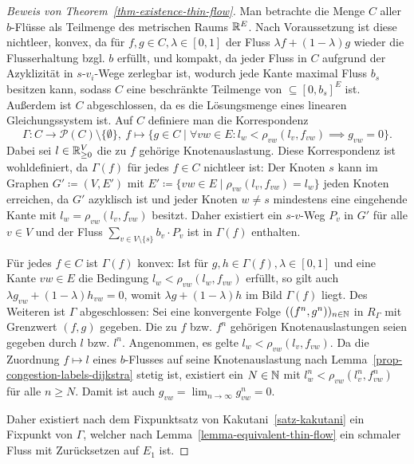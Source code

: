 \begin{proof}[Beweis von Theorem~\ref{thm-existence-thin-flow}]
	Man betrachte die Menge $C$ aller $b$-Flüsse als Teilmenge des metrischen Raums $\mathbb{R}^E$.
	Nach Voraussetzung ist diese nichtleer, konvex, da für $f, g\in C, \lambda \in [0,1]$ der Fluss $\lambda f + (1-\lambda)g$ wieder die Flusserhaltung bzgl. $b$ erfüllt, und kompakt, da jeder Fluss in $C$ aufgrund der Azyklizität in $s$-$v_i$-Wege zerlegbar ist, wodurch jede Kante maximal Fluss $b_s$ besitzen kann, sodass $C$ eine beschränkte Teilmenge von $\subseteq [0, b_s]^E$ ist.
	Außerdem ist $C$ abgeschlossen, da es die Lösungsmenge eines linearen Gleichungssystem ist.
	Auf $C$ definiere man die Korrespondenz
	\[
	\Gamma: C\to \mathcal{P}(C)\setminus\{ \emptyset \}, ~ f\mapsto \{ g\in C \mid \forall vw\in E: l_w < \rho_{vw}(l_v, f_{vw}) \implies g_{vw} = 0 \}.
	\]
	Dabei sei $l\in\mathbb{R}_{\geq 0}^V$ die zu $f$ gehörige Knotenauslastung.
	Diese Korrespondenz ist wohldefiniert, da $\Gamma(f)$ für jedes $f\in C$ nichtleer ist:
	Der Knoten $s$ kann im Graphen $G'\coloneq (V, E')$ mit $E'\coloneq \{ vw\in E \mid \rho_{vw}(l_v, f_{vw})=l_w \}$ jeden Knoten erreichen, da $G'$ azyklisch ist und jeder Knoten $w\neq s$ mindestens eine eingehende Kante mit $l_w = \rho_{vw}(l_v, f_{vw})$ besitzt. 
	Daher existiert ein $s$-$v$-Weg $P_v$ in $G'$ für alle $v\in V$ und der Fluss $\sum_{v\in V\setminus\{ s\}} b_v \cdot P_v$ ist in $\Gamma(f)$ enthalten.
	
	Für jedes $f\in C$ ist $\Gamma(f)$ konvex: Ist für $g, h\in \Gamma(f), \lambda\in [0,1]$ und eine Kante $vw\in E$ die Bedingung $l_w < \rho_{vw}(l_w, f_{vw})$ erfüllt, so gilt auch $\lambda g_{vw} + (1-\lambda) h_{vw} = 0$, womit $\lambda g + (1-\lambda)h$ im Bild $\Gamma(f)$ liegt.
	Des Weiteren ist $\Gamma$ abgeschlossen: 
	Sei eine konvergente Folge $((f^{n}, g^{n}))_{n\in\mathbb{N}}$ in $R_\Gamma$ mit Grenzwert $(f, g)$ gegeben.
	Die zu $f$ bzw. $f^n$ gehörigen Knotenauslastungen seien gegeben durch $l$ bzw. $l^n$.
	Angenommen, es gelte $l_w < \rho_{vw}(l_v, f_{vw})$.
	Da die Zuordnung $f\mapsto l$ eines $b$-Flusses auf seine Knotenauslastung nach Lemma~\ref{prop-congestion-labels-dijkstra} stetig ist, existiert ein $N\in\mathbb{N}$ mit $l_w^n<\rho_{vw}(l_v^n, f_{vw}^n)$ für alle $n\geq N$.
	Damit ist auch $g_{vw} = \lim_{n\to\infty} g_{vw}^n = 0$.
	
	Daher existiert nach dem Fixpunktsatz von Kakutani~\ref{satz-kakutani} ein Fixpunkt von $\Gamma$, welcher nach Lemma~\ref{lemma-equivalent-thin-flow} ein schmaler Fluss mit Zurücksetzen auf $E_1$ ist.
\end{proof}

